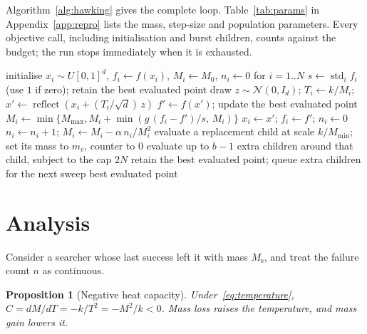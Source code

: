 \documentclass[10pt,a4paper]{article}
\newtheorem{proposition}{Proposition}
\newcommand{\Ms}{M_{\mathrm{s}}}
\newcommand{\Mmin}{M_{\min}}
\begin{document}
Algorithm~\ref{alg:hawking} gives the complete loop. Table~\ref{tab:params} in Appendix~\ref{app:repro} lists the mass, step-size and
population parameters. Every objective call, including initialisation and burst
children, counts against the budget; the run stops immediately when it is exhausted.

\begin{algorithm}[t]
\caption{Hawking cooling for a population of $N$ searchers.}
\label{alg:hawking}
\begin{algorithmic}[1]
\State initialise $x_i \sim U[0,1]^d$, $f_i \gets f(x_i)$, $M_i \gets M_0$, $n_i \gets 0$ for $i=1..N$
\State $s \gets \operatorname{std}_i f_i$ (use $1$ if zero); retain the best evaluated point
    \State draw $z\sim\mathcal N(0,I_d)$; $T_i \gets k/M_i$; $x' \gets \operatorname{reflect}(x_i + (T_i/\sqrt d)\,z)$
    \State $f' \gets f(x')$; update the best evaluated point
      \State $M_i \gets \min\{M_{\max}, M_i + \min(g\,(f_i-f')/s,\,M_i)\}$
      \State $x_i \gets x'$; $f_i \gets f'$; $n_i \gets 0$ 
    \Else
      \State $n_i \gets n_i + 1$; \quad $M_i \gets M_i - \alpha\, n_i / M_i^2$ 
    \EndIf
    \If{$M_i < \Mmin$}
      \State evaluate a replacement child at scale $k/\Mmin$; set its mass to $m_c$, counter to $0$
      \State evaluate up to $b-1$ extra children around that child, subject to the cap $2N$
      \State retain the best evaluated point; queue extra children for the next sweep
    \EndIf
  \EndFor
\EndWhile
\State \Return best evaluated point
\end{algorithmic}
\end{algorithm}

\section{Analysis}
\label{sec:analysis}

Consider a searcher whose last success left it with mass $\Ms$, and treat the
failure count $n$ as continuous.

\begin{proposition}[Negative heat capacity]
Under~\eqref{eq:temperature}, $C = dM/dT = -k/T^2 = -M^2/k < 0$. Mass loss raises the
temperature, and mass gain lowers it.
\end{proposition}
\end{document}
